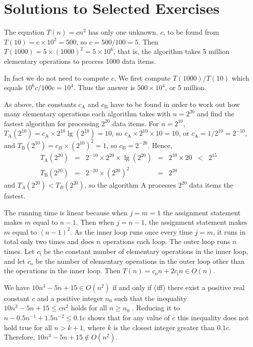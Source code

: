 \chapter{Solutions to Selected Exercises}

 The equation $T(n)=cn^2$ has only one unknown, $c$, to be found
from $T(10) = c\times10^2 = 500$, so $c=500/100 = 5$. Then 
$T(1000)=5\times(1000)^2=5\times10^6$, that is,
the algorithm takes 5 million elementary operations to process 1000 data items.

In fact we do not need to compute $c$. We first compute $T(1000)/T(10)$ which 
equals $10^6c/100c = 10^4$. Thus the answer is $500 \times 10^4$, or 5 million.

As above, the constants \(c_\mathrm{A}\) and \(c_\mathrm{B}\) have to be found
in order to 
work out how many elementary operations 
each algorithm takes with \(n=2^{20}\) and find the fastest algorithm for 
processing \(2^{20}\) data items.
For $n=2^{10}$, $T_\mathrm{A}(2^{10})=c_\mathrm{A}\times 2^{10} \lg(2^{10}) = 10$, 
so $c_\mathrm{A}\times2^{10}\times10 = 10$,
or $c_\mathrm{A}= 1/2^{10} = 2^{-10}$, and $T_\mathrm{B}(2^{10})=c_B  \times(2^{10})^2 = 1$, 
so $c_\mathrm{B}= 2^{-20}$.
Hence,
\[
\begin{array}{rcccllll}
T_\mathrm{A}(2^{20}) & = & 2^{-10} \times 2^{20} \times \lg(2^{20}) 
                                                     & = & 2^{10} \times 20 & < & 2^{15}\\
T_\mathrm{B}(2^{20}) & = & 2^{-20} \times (2^{20})^{2} & = & 2^{20}
\end{array}
\]
and \(T_A(2^{20}) < T_B(2^{20})\), so the algorithm A processes \(2^{20}\) 
data items the fastest.

The running time is linear because when \(j=m=1\) the assignment statement makes \(m\) 
equal to \(n-1\). Then when \(j=n-1\), the assignment statement makes \(m\) equal to 
\((n-1)^2\). As the inner loop runs once every time \(j=m\), it runs in total only two 
times and does \(n\) operations each loop. The outer loop runs \(n\) times. 
Let $c_\mathrm{i}$ be the constant number of elementary operations in the inner loop, 
and let $c_\mathrm{o}$ be the
number of elementary operations in the outer loop other than the operations in 
the inner loop. 
Then $T(n) = c_\mathrm{o}n + 2c_\mathrm{i}n \in O(n)$.

We have $10n^3-5n+15 \in O(n^2)$  if and only if (iff) there exist a positive real 
constant $c$ 
and a positive integer $n_0$ such that the inequality \(10n^3-5n+15 \leq cn^2\) 
holds for all $n \ge n_0$ .
Reducing it to \(n -0.5n^{-1} + 1.5n^{-2} \leq 0.1c\) shows 
that for any value of \(c\) this inequality does not hold true for all \(n> k + 1\), 
where $k$ is the
closest integer greater than $0.1c$. Therefore, $10n^3-5n+15 \notin O(n^2)$.

